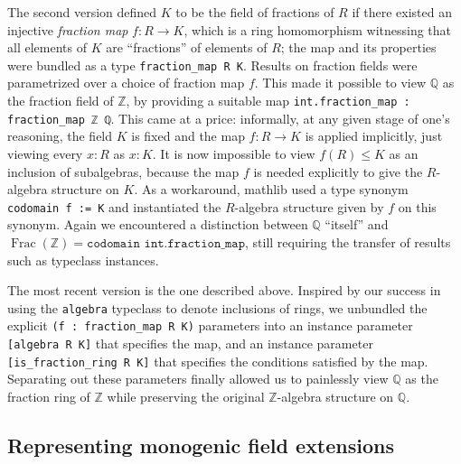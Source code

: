 \documentclass[sn-mathphys]{sn-jnl}%
\newcommand{\lean}[1]{\texttt{#1}\xspace}
\newcommand{\mathlib}{\textsf{mathlib}\xspace}
\newcommand{\QQ}{\mathbb{Q}}
\renewcommand{\Z}{\mathbb{Z}}
\DeclareMathOperator{\Frac}{Frac}
\begin{document}
The second version
defined $K$ to be the field of fractions of $R$ if there existed an injective \emph{fraction map} $f : R \to K$, which is a ring homomorphism witnessing that all elements of $K$ are ``fractions'' of elements of $R$;
the map and its properties were bundled as a type \lean{fraction\_map R K}.
Results on fraction fields were parametrized over a choice of fraction map $f$.
This made it possible to view $\QQ$ as the fraction field of $\Z$, by providing a suitable map \lean{int.fraction\_map : fraction\_map ℤ ℚ}.
This came at a price:
informally, at any given stage of one's reasoning, the field $K$ is fixed and the map $f\colon R\to K$ is applied implicitly, just viewing every $x:R$ as $x:K$.
It is now impossible to view $f(R) \leq K$ as an inclusion of subalgebras,
because the map $f$ is needed explicitly to give the $R$-algebra structure on $K$.
As a workaround, \mathlib used a type synonym \lean{codomain f := K} and instantiated the $R$-algebra structure given by $f$ on this synonym.
Again we encountered a distinction between $\QQ$ ``itself'' and $\Frac(\Z) = \lean{codomain int.fraction\_map}$,
still requiring the transfer of results such as typeclass instances.

The most recent version is the one described above.
Inspired by our success in using the \lean{algebra} typeclass to denote inclusions of rings,
we unbundled the explicit \lean{(f : fraction\_map R K)} parameters into
an instance parameter \lean{[algebra R K]} that specifies the map,
and an instance parameter \lean{[is\_fraction\_ring R K]} that specifies the conditions satisfied by the map.
Separating out these parameters finally allowed us to painlessly view $\QQ$ as the fraction ring of $\Z$ while preserving the original $\Z$-algebra structure on $\QQ$.

\subsection{Representing monogenic field extensions} \label{sec:monogenic-field-extension}
\end{document}
